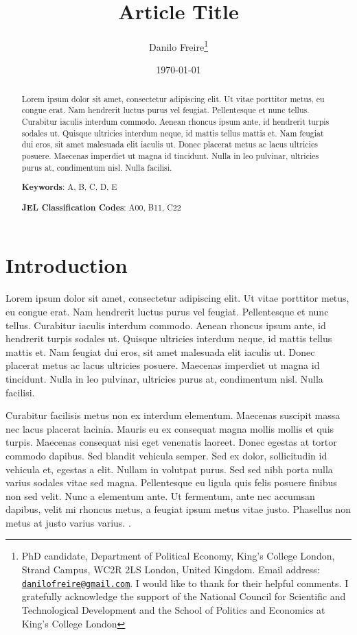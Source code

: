 \documentclass[a4paper,12pt]{article}
\title{\textbf{Article Title}}
\author{Danilo Freire\thanks{PhD candidate, Department of Political Economy, King's College London, Strand Campus, WC2R 2LS London, United Kingdom. Email address: \href{mailto:danilofreire@gmail.com}{\texttt{danilofreire@gmail.com}}. I would like to thank for their helpful comments. I gratefully acknowledge the support of the National Council for Scientific and Technological Development and the School of Politics and Economics at King’s College London}
}
\date{\today}
\begin{document}
\maketitle

\begin{abstract}
 \noindent
 Lorem ipsum dolor sit amet, consectetur adipiscing elit. Ut vitae porttitor metus, eu congue erat. Nam hendrerit luctus purus vel feugiat. Pellentesque et nunc tellus. Curabitur iaculis interdum commodo. Aenean rhoncus ipsum ante, id hendrerit turpis sodales ut. Quisque ultricies interdum neque, id mattis tellus mattis et. Nam feugiat dui eros, sit amet malesuada elit iaculis ut. Donec placerat metus ac lacus ultricies posuere. Maecenas imperdiet ut magna id tincidunt. Nulla in leo pulvinar, ultricies purus at, condimentum nisl. Nulla facilisi.

 \vspace{.5cm}
 \noindent
 \textbf{Keywords}: A, B, C, D, E

 \vspace{.25cm}
 \noindent
 \textbf{JEL Classification Codes}: A00, B11, C22
\end{abstract}

\newpage

\section{Introduction}
\label{sec:intro}

Lorem ipsum dolor sit amet, consectetur adipiscing elit. Ut vitae porttitor metus, eu congue erat. Nam hendrerit luctus purus vel feugiat. Pellentesque et nunc tellus. Curabitur iaculis interdum commodo. Aenean rhoncus ipsum ante, id hendrerit turpis sodales ut. Quisque ultricies interdum neque, id mattis tellus mattis et. Nam feugiat dui eros, sit amet malesuada elit iaculis ut. Donec placerat metus ac lacus ultricies posuere. Maecenas imperdiet ut magna id tincidunt. Nulla in leo pulvinar, ultricies purus at, condimentum nisl. Nulla facilisi.

Curabitur facilisis metus non ex interdum elementum. Maecenas suscipit massa nec lacus placerat lacinia. Mauris eu ex consequat magna mollis mollis et quis turpis. Maecenas consequat nisi eget venenatis laoreet. Donec egestas at tortor commodo dapibus. Sed blandit vehicula semper. Sed ex dolor, sollicitudin id vehicula et, egestas a elit. Nullam in volutpat purus. Sed sed nibh porta nulla varius sodales vitae sed magna. Pellentesque eu ligula quis felis posuere finibus non sed velit. Nunc a elementum ante. Ut fermentum, ante nec accumsan dapibus, velit mi rhoncus metus, a feugiat ipsum metus vitae justo. Phasellus non metus at justo varius varius. \citetext{\citealp[71]{labronici2012paratodos}; \citealp[142]{misse2007illegal}}.
\end{document}
